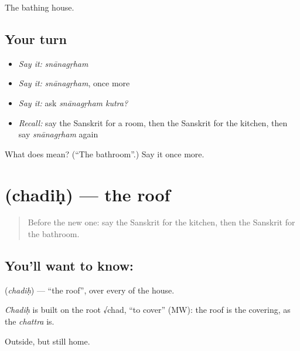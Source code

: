 \begin{grammarlens}[title={What you've built}]
The bathing house.
\end{grammarlens}

\subsection*{Your turn}
\begin{itemize}
\raggedright
  \item \emph{Say it:} \emph{snānagṛham}
  \item \emph{Say it:} \emph{snānagṛham}, once more
  \item \emph{Say it:} ask \emph{snānagṛham kutra?}
  \item \emph{Recall:} say the Sanskrit for a room, then the Sanskrit for the kitchen, then say \emph{snānagṛham} again
\end{itemize}

\begin{tcolorbox}[breakable,colback=teal!4,colframe=teal!35!black,title={Before you move on}]
What does  mean? (\textquotedblleft{}The bathroom\textquotedblright{}.) Say it once more.
\end{tcolorbox}
\section[\texorpdfstring{\sk{छदिः} (chadiḥ)}{छदिः (chadiḥ)}]{ (chadiḥ) — the roof}

\label{lesson:SA-C77-roof}



\begin{quote}
Before the new one: say the Sanskrit for the kitchen, then the Sanskrit for the bathroom.
\end{quote}

\subsection*{You'll want to know: }
\textbf{} (\emph{chadiḥ}) — \textquotedblleft{}the roof\textquotedblright{}, over every \textbf{} of the house.

\begin{cousinweb}
\emph{Chadiḥ} is built on the root √chad, \textquotedblleft{}to cover\textquotedblright{} (MW): the roof is the covering, as the \emph{chattra} is.
\end{cousinweb}

\begin{grammarlens}[title={What you've built}]
Outside, but still home.
\end{grammarlens}

